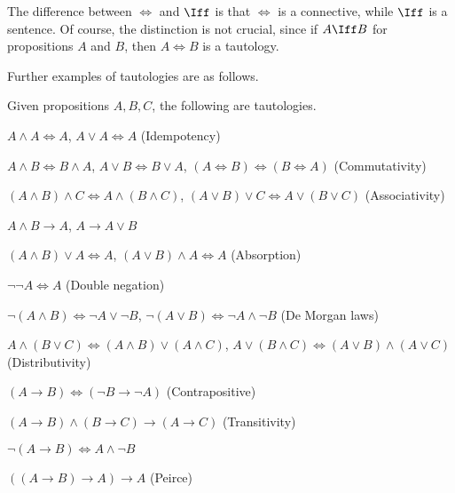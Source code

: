 The difference between \(\iff\) and \(\Iff\)
is that \(\iff\) is a connective,
while \(\Iff\) is a sentence.
Of course, the distinction is not crucial,
since if \(A\Iff B\) for propositions \(A\) and \(B\),
then \(A\iff B\) is a tautology.

Further examples of tautologies are as follows.

\begin{example}
    \label{exm:taut}
    Given propositions \(A,B,C\), the following are tautologies.
    \begin{nlist}
        \item \(A\wedge A\iff A\),
        \(A\vee A\iff A\)
        \hfill (Idempotency)

        \item \(A\wedge B\iff B\wedge A\),
        \(A\vee B\iff B\vee A\),
        \((A\iff B)\iff(B\iff A)\)
        \hfill (Commutativity)

        \item \((A\wedge B)\wedge C\iff A\wedge (B\wedge C)\),
        \((A\vee B)\vee C\iff A\vee(B\vee C)\)
        \hfill (Associativity)

        \item \(A\wedge B\to A\),
        \(A\to A\vee B\)

        \item \((A\wedge B)\vee A\iff A\),
        \((A\vee B)\wedge A\iff A\)
        \hfill (Absorption)

        \item \(\neg\neg A\iff A\)
        \hfill (Double negation)

        \item \(\neg(A\wedge B)\iff\neg A\vee\neg B\),
        \(\neg(A\vee B)\iff\neg A\wedge\neg B\)
        \hfill (De Morgan laws)

        \item \(A\wedge(B\vee C)\iff(A\wedge B)\vee(A\wedge C)\),
        \(A\vee(B\wedge C)\iff(A\vee B)\wedge(A\vee C)\)
        \hfill (Distributivity)
        
        \item \((A\to B)\iff(\neg B\to\neg A)\)
        \hfill (Contrapositive)

        \item \((A\to B)\wedge(B\to C)\to(A\to C)\)
        \hfill (Transitivity)

        \item \(\neg (A\to B)\iff A\wedge\neg B\)

        \item \(((A\to B)\to A)\to A\)
        \hfill (Peirce)
    \end{nlist}
\end{example}

